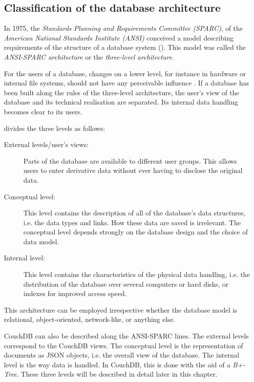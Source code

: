 \subsection{Classification of the database architecture}
\label{subsec:3schema}

In 1975, the \textit{Standards Planning and Requirements Committee (SPARC)}, of the \textit{American National Standards Institute (ANSI)} conceived a model describing requirements of the structure of a database system (). This model was called the \textit{ANSI-SPARC architecture} or the \textit{three-level architecture}.

For the users of a database, changes on a lower level, for instance in hardware or internal file systems, should not have any perceivable influence . If a database has been built along the rules of the three-level architecture, the user's view of the database and its technical realisation are separated. Its internal data handling becomes clear to its users.

 divides the three levels as follows:

\begin{description}
  \item[External levels/user's views:] Parts of the database are available to different user groups. This allows users to enter derivative data without ever having to disclose the original data.
  \item[Conceptual level:] This level contains the description of all of the database's data structures, i.e. the data types and links. How these data are saved is irrelevant. The conceptual level depends strongly on the database design and the choice of data model.
  \item[Internal level:] This level contains the characteristics of the physical data handling, i.e. the distribution of the database over several computers or hard disks, or indexes for improved access speed.
\end{description}

This architecture can be employed irrespective whether the database model is relational, object-oriented, network-like, or anything else.

CouchDB can also be described along the ANSI-SPARC lines. The external levels correspond to the CouchDB views. The conceptual level is the representation of documents as JSON objects, i.e. the overall view of the database. The internal level is the way data is handled. In CouchDB, this is done with the aid of a \textit{B+-Tree}. These three levels will be described in detail later in this chapter.

